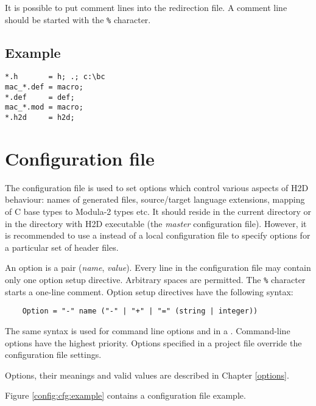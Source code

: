 It is possible to put comment lines into the redirection file. A
comment line should be started with the \verb+%+ character.

\subsection*{Example}

\begin{verbatim}
*.h       = h; .; c:\bc
mac_*.def = macro;
*.def     = def;
mac_*.mod = macro;
*.h2d     = h2d;
\end{verbatim}

\section{Configuration file}
\label{config:cfg}

The configuration file is used to set options which control various
aspects of H2D behaviour: names of generated files, source/target language
extensions, mapping of C base types to Modula-2 types etc. It should reside
in the current directory or in the directory with H2D executable (the
{\em master} configuration file). However, it is recommended to use
a \ProjectFile{} instead of a local configuration file to specify
options for a particular set of header files.

An option is a pair ({\em name}, {\em value}). Every line in
the configuration file may contain only one option setup directive.
Arbitrary spaces are permitted. The \verb'%' character starts a
one-line comment. Option setup directives have the following syntax:

\verb'    Option = "-" name ("-" | "+" | "=" (string | integer))'

The same syntax is used for command line options and in a \ProjectFile{}.
Command-line options have the highest priority. Options specified
in a project file override the configuration file settings.

Options, their meanings and valid values are described in Chapter
\ref{options}.

\ifonline\else
Figure \ref{config:cfg:example} contains a configuration file example.
\fi

